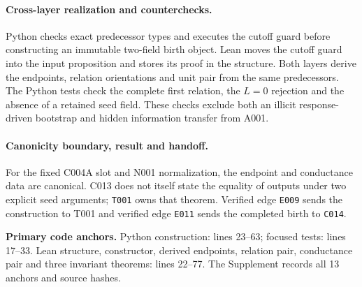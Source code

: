 \paragraph*{Cross-layer realization and counterchecks.}
Python checks exact predecessor types and executes the cutoff guard before
constructing an immutable two-field birth object.  Lean moves the cutoff guard
into the input proposition and stores its proof in the structure.  Both layers
derive the endpoints, relation orientations and unit pair from the same
predecessors.  The Python tests check the complete first relation, the $L=0$
rejection and the absence of a retained seed field.  These checks exclude both
an illicit response-driven bootstrap and hidden information transfer from A001.

\paragraph*{Canonicity boundary, result and handoff.}
For the fixed C004A slot and N001 normalization, the endpoint and conductance
data are canonical.  C013 does not itself state the equality of outputs under
two explicit seed arguments; \texttt{T001} owns that theorem.  Verified edge
\texttt{E009} sends the construction to T001 and verified edge \texttt{E011}
sends the completed birth to \texttt{C014}.

\noindent\textbf{Primary code anchors.}
Python construction: lines 23--63; focused tests: lines 17--33.  Lean structure,
constructor, derived endpoints, relation pair, conductance pair and three
invariant theorems: lines 22--77.  The Supplement records all 13 anchors and
source hashes.
